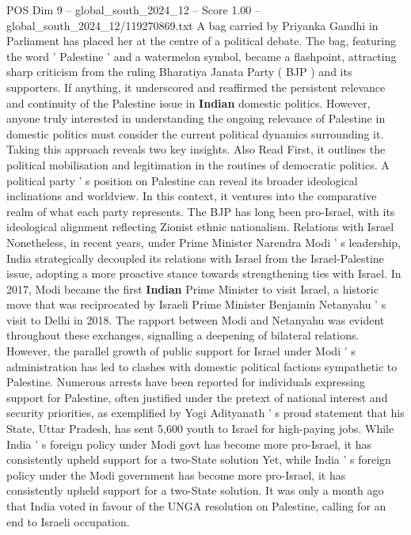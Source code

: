 \begin{textsample}{POS Dim 9 – global\_south\_2024\_12 – Score 1.00 – global\_south\_2024\_12/119270869.txt}  \label{ex:f9_pos_234}
A bag carried by Priyanka Gandhi in Parliament has placed her at the centre of a political debate.
The bag, featuring the word ' Palestine ' and a watermelon symbol, became a flashpoint, attracting sharp criticism from the ruling Bharatiya Janata Party ( BJP ) and its supporters.
If anything, it underscored and reaffirmed the persistent relevance and continuity of the Palestine issue in \textbf{Indian} domestic politics.
However, anyone truly interested in understanding the ongoing relevance of Palestine in domestic politics must consider the current political dynamics surrounding it.
Taking this approach reveals two key insights.
Also Read First, it outlines the political mobilisation and legitimation in the routines of democratic politics.
A political party ' s position on Palestine can reveal its broader ideological inclinations and worldview.
In this context, it ventures into the comparative realm of what each party represents.
The BJP has long been pro-Israel, with its ideological alignment reflecting Zionist ethnic nationalism.
Relations with Israel Nonetheless, in recent years, under Prime Minister Narendra Modi ' s leadership, India strategically decoupled its relations with Israel from the Israel-Palestine issue, adopting a more proactive stance towards strengthening ties with Israel.
In 2017, Modi became the first \textbf{Indian} Prime Minister to visit Israel, a historic move that was reciprocated by Israeli Prime Minister Benjamin Netanyahu ' s visit to Delhi in 2018.
The rapport between Modi and Netanyahu was evident throughout these exchanges, signalling a deepening of bilateral relations.
However, the parallel growth of public support for Israel under Modi ' s administration has led to clashes with domestic political factions sympathetic to Palestine.
Numerous arrests have been reported for individuals expressing support for Palestine, often justified under the pretext of national interest and security priorities, as exemplified by Yogi Adityanath ' s proud statement that his State, Uttar Pradesh, has sent 5,600 youth to Israel for high-paying jobs.
While India ' s foreign policy under Modi govt has become more pro-Israel, it has consistently upheld support for a two-State solution Yet, while India ' s foreign policy under the Modi government has become more pro-Israel, it has consistently upheld support for a two-State solution.
It was only a month ago that India voted in favour of the UNGA resolution on Palestine, calling for an end to Israeli occupation.

\end{textsample}
